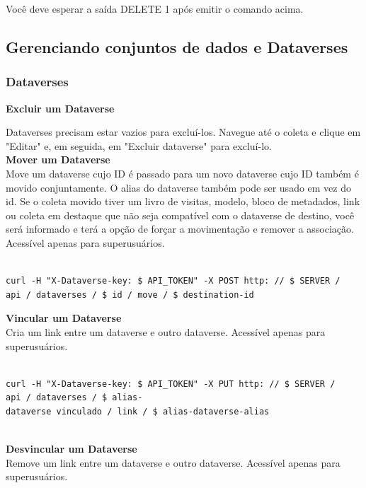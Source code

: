 \documentclass[12pt,hidelinks]{article}
\begin{document}
Você deve esperar a saída DELETE 1 após emitir o comando acima.

\subsection{Gerenciando conjuntos de dados e Dataverses}

\subsubsection{Dataverses}

\qquad\textbf{Excluir um Dataverse}

Dataverses precisam estar vazios para excluí-los. Navegue até o coleta e clique em "Editar" e, em seguida, em "Excluir dataverse" para excluí-lo.\\

\textbf{Mover um Dataverse}\\

Move um dataverse cujo ID é passado para um novo dataverse cujo ID também é movido conjuntamente. O alias do dataverse também pode ser usado em vez do id. Se o coleta movido tiver um livro de visitas, modelo, bloco de metadados, link ou coleta em destaque que não seja compatível com o dataverse de destino, você será informado e terá a opção de forçar a movimentação e remover a associação. Acessível apenas para superusuários.

\begin{verbatim}

curl -H "X-Dataverse-key: $ API_TOKEN" -X POST http: // $ SERVER / 
api / dataverses / $ id / move / $ destination-id

\end{verbatim}

\textbf{Vincular um Dataverse}\\

Cria um link entre um dataverse e outro dataverse. Acessível apenas para superusuários.

\begin{verbatim}

curl -H "X-Dataverse-key: $ API_TOKEN" -X PUT http: // $ SERVER /
api / dataverses / $ alias-
dataverse vinculado / link / $ alias-dataverse-alias
 
\end{verbatim}
 
\textbf{Desvincular um Dataverse}\\

Remove um link entre um dataverse e outro dataverse. Acessível apenas para \\superusuários.
\end{document}
